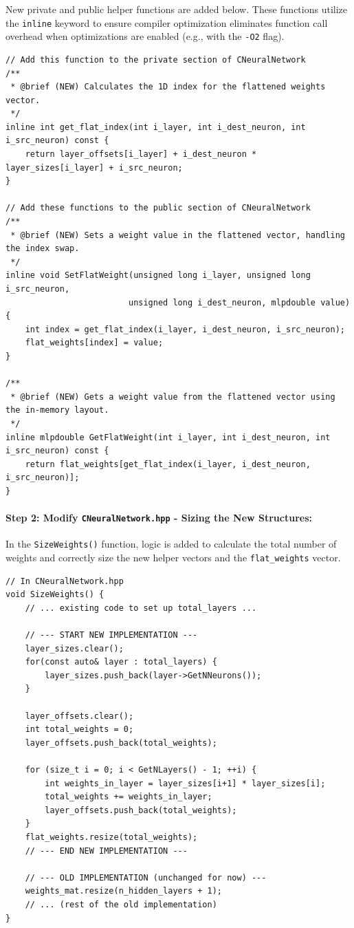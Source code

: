 \documentclass{article}
\begin{document}
New private and public helper functions are added below. These functions utilize the \texttt{inline} keyword to ensure compiler optimization eliminates function call overhead when optimizations are enabled (e.g., with the \texttt{-O2} flag).

\begin{verbatim}
// Add this function to the private section of CNeuralNetwork
/**
 * @brief (NEW) Calculates the 1D index for the flattened weights vector.
 */
inline int get_flat_index(int i_layer, int i_dest_neuron, int i_src_neuron) const {
    return layer_offsets[i_layer] + i_dest_neuron * layer_sizes[i_layer] + i_src_neuron;
}

// Add these functions to the public section of CNeuralNetwork
/**
 * @brief (NEW) Sets a weight value in the flattened vector, handling the index swap.
 */
inline void SetFlatWeight(unsigned long i_layer, unsigned long i_src_neuron, 
                         unsigned long i_dest_neuron, mlpdouble value) {
    int index = get_flat_index(i_layer, i_dest_neuron, i_src_neuron);
    flat_weights[index] = value;
}

/**
 * @brief (NEW) Gets a weight value from the flattened vector using the in-memory layout.
 */
inline mlpdouble GetFlatWeight(int i_layer, int i_dest_neuron, int i_src_neuron) const {
    return flat_weights[get_flat_index(i_layer, i_dest_neuron, i_src_neuron)];
}
\end{verbatim}

\paragraph{Step 2: Modify \texttt{CNeuralNetwork.hpp} - Sizing the New Structures:}

In the \texttt{SizeWeights()} function, logic is added to calculate the total number of weights and correctly size the new helper vectors and the \texttt{flat\_weights} vector.

\begin{verbatim}
// In CNeuralNetwork.hpp
void SizeWeights() {
    // ... existing code to set up total_layers ...

    // --- START NEW IMPLEMENTATION ---
    layer_sizes.clear();
    for(const auto& layer : total_layers) {
        layer_sizes.push_back(layer->GetNNeurons());
    }

    layer_offsets.clear();
    int total_weights = 0;
    layer_offsets.push_back(total_weights);

    for (size_t i = 0; i < GetNLayers() - 1; ++i) {
        int weights_in_layer = layer_sizes[i+1] * layer_sizes[i];
        total_weights += weights_in_layer;
        layer_offsets.push_back(total_weights);
    }
    flat_weights.resize(total_weights);
    // --- END NEW IMPLEMENTATION ---

    // --- OLD IMPLEMENTATION (unchanged for now) ---
    weights_mat.resize(n_hidden_layers + 1);
    // ... (rest of the old implementation)
}
\end{verbatim}
\end{document}
